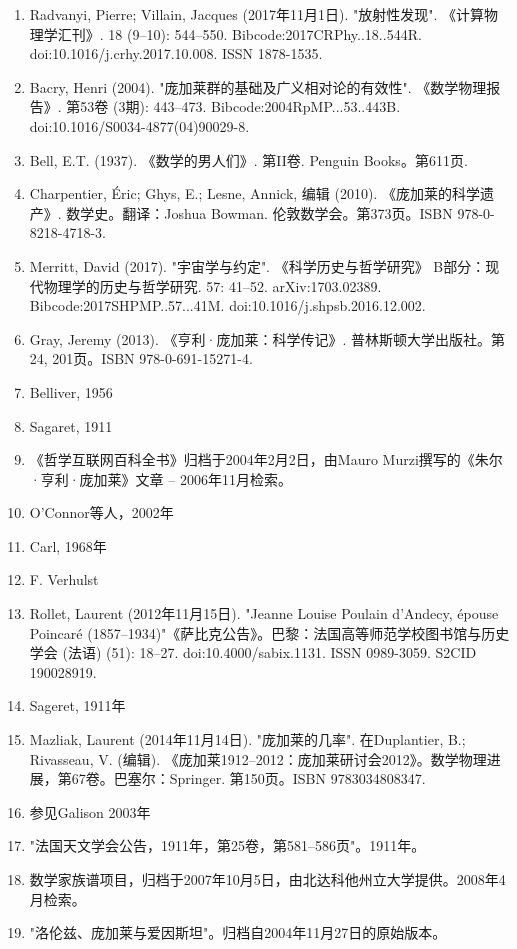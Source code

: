 \begin{enumerate}
\item Radvanyi, Pierre; Villain, Jacques (2017年11月1日). "放射性发现". 《计算物理学汇刊》. 18 (9–10): 544–550. Bibcode:2017CRPhy..18..544R. doi:10.1016/j.crhy.2017.10.008. ISSN 1878-1535.  
\item Bacry, Henri (2004). "庞加莱群的基础及广义相对论的有效性". 《数学物理报告》. 第53卷 (3期): 443–473. Bibcode:2004RpMP...53..443B. doi:10.1016/S0034-4877(04)90029-8.  
\item Bell, E.T. (1937). 《数学的男人们》. 第II卷. Penguin Books。第611页.  
\item Charpentier, Éric; Ghys, E.; Lesne, Annick, 编辑 (2010). 《庞加莱的科学遗产》. 数学史。翻译：Joshua Bowman. 伦敦数学会。第373页。ISBN 978-0-8218-4718-3.  
\item Merritt, David (2017). "宇宙学与约定". 《科学历史与哲学研究》 B部分：现代物理学的历史与哲学研究. 57: 41–52. arXiv:1703.02389. Bibcode:2017SHPMP..57...41M. doi:10.1016/j.shpsb.2016.12.002.  
\item Gray, Jeremy (2013). 《亨利·庞加莱：科学传记》. 普林斯顿大学出版社。第24, 201页。ISBN 978-0-691-15271-4.  
\item Belliver, 1956  
\item Sagaret, 1911  
\item 《哲学互联网百科全书》归档于2004年2月2日，由Mauro Murzi撰写的《朱尔·亨利·庞加莱》文章 – 2006年11月检索。  
\item O'Connor等人，2002年  
\item Carl, 1968年  
\item F. Verhulst  
\item Rollet, Laurent (2012年11月15日). "Jeanne Louise Poulain d'Andecy, épouse Poincaré (1857–1934)"《萨比克公告》。巴黎：法国高等师范学校图书馆与历史学会 (法语) (51): 18–27. doi:10.4000/sabix.1131. ISSN 0989-3059. S2CID 190028919.  
\item Sageret, 1911年  
\item Mazliak, Laurent (2014年11月14日). "庞加莱的几率". 在Duplantier, B.; Rivasseau, V. (编辑). 《庞加莱1912–2012：庞加莱研讨会2012》。数学物理进展，第67卷。巴塞尔：Springer. 第150页。ISBN 9783034808347.  
\item 参见Galison 2003年  
\item "法国天文学会公告，1911年，第25卷，第581–586页"。1911年。  
\item 数学家族谱项目，归档于2007年10月5日，由北达科他州立大学提供。2008年4月检索。  
\item "洛伦兹、庞加莱与爱因斯坦"。归档自2004年11月27日的原始版本。  

\end{enumerate}
